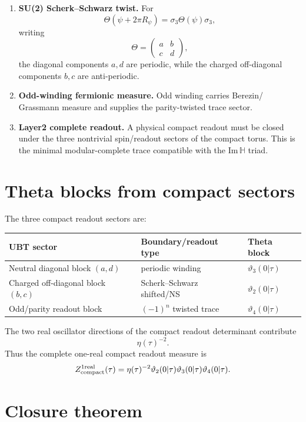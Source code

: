 \documentclass[12pt,a4paper]{article}
\begin{document}
\begin{enumerate}
\item \textbf{SU(2) Scherk--Schwarz twist.}  For
\[
  \Theta(\psi+2\pi R_\psi)=\sigma_3\Theta(\psi)\sigma_3,
\]
writing
\[
  \Theta=\begin{pmatrix}a&b\\ c&d\end{pmatrix},
\]
the diagonal components $a,d$ are periodic, while the charged off-diagonal
components $b,c$ are anti-periodic.

\item \textbf{Odd-winding fermionic measure.}  Odd winding carries Berezin/
Grassmann measure and supplies the parity-twisted trace sector.

\item \textbf{Layer2 complete readout.}  A physical compact readout must be
closed under the three nontrivial spin/readout sectors of the compact torus.
This is the minimal modular-complete trace compatible with the
$\mathrm{Im}\,\mathbb H$ triad.
\end{enumerate}

\section{Theta blocks from compact sectors}

The three compact readout sectors are:

\begin{center}
\begin{tabular}{lll}
\toprule
UBT sector & Boundary/readout type & Theta block \\
\midrule
Neutral diagonal block $(a,d)$ & periodic winding & $\vartheta_3(0|\tau)$ \\
Charged off-diagonal block $(b,c)$ & Scherk--Schwarz shifted/NS & $\vartheta_2(0|\tau)$ \\
Odd/parity readout block & $(-1)^n$ twisted trace & $\vartheta_4(0|\tau)$ \\
\bottomrule
\end{tabular}
\end{center}

The two real oscillator directions of the compact readout determinant contribute
\[
  \eta(\tau)^{-2}.
\]
Thus the complete one-real compact readout measure is
\[
  Z_{\rm compact}^{1\rm real}(\tau)
  =\eta(\tau)^{-2}
    \vartheta_2(0|\tau)
    \vartheta_3(0|\tau)
    \vartheta_4(0|\tau).
\]

\section{Closure theorem}
\end{document}

